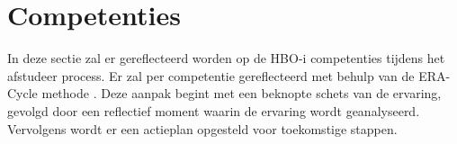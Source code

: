 \section{Competenties}
In deze sectie zal er gereflecteerd worden op de HBO-i \parencite{HBOICompetenties} competenties tijdens het afstudeer process.
Er zal per competentie gereflecteerd met behulp van de ERA-Cycle methode \parencite{BeginningReflectivePractice}.
Deze aanpak begint met een beknopte schets van de ervaring, gevolgd door een reflectief moment waarin de ervaring wordt geanalyseerd.
Vervolgens wordt er een actieplan opgesteld voor toekomstige stappen.


\newpage





